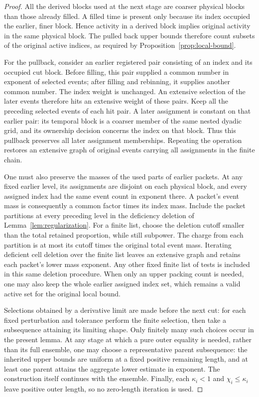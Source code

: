 \begin{proof}
All the derived blocks used at the next stage are coarser physical blocks
than those already filled. A filled time is present only because its
index occupied the earlier, finer block. Hence activity in a derived
block implies original activity in the same physical block. The pulled
back upper bounds therefore count subsets of the original active
indices, as required by Proposition~\ref{prop:local-bound}.

For the pullback, consider an earlier registered pair consisting of an
index and its occupied cut block. Before filling, this pair supplied a
common number in exponent of selected events; after filling and
rebinning, it supplies another common number. The index weight is
unchanged. An extensive selection of the later events therefore hits an
extensive weight of these pairs. Keep all the preceding selected events
of each hit pair. A later assignment is constant on that earlier pair:
its temporal block is a coarser member of the same nested dyadic grid,
and its ownership decision concerns the index on that block. Thus this
pullback preserves all later assignment memberships. Repeating the
operation restores an extensive graph of original events carrying all
assignments in the finite chain.

One must also preserve the masses of the used parts of earlier packets.
At any fixed earlier level, its assignments are disjoint on each physical
block, and every assigned index had the same event count in exponent
there. A packet's event mass is consequently a common factor times its
index mass. Include the packet partitions at every preceding level in
the deficiency deletion of Lemma~\ref{lem:regularization}. For a finite
list, choose the deletion cutoff smaller than the total retained
proportion, while still subpower. The charge from each partition is at
most its cutoff times the original total event mass. Iterating deficient
cell deletion over the finite list leaves an extensive graph and retains
each packet's lower mass exponent. Any other fixed finite list of tests
is included in this same deletion procedure. When only an upper packing
count is needed, one may also keep the whole earlier assigned index set,
which remains a valid active set for the original local bound.

Selections obtained by a derivative limit are made before the next cut:
for each fixed perturbation and tolerance perform the finite selection,
then take a subsequence attaining its limiting shape. Only finitely many
such choices occur in the present lemma. At any stage at which a pure
outer equality is needed, rather than its full ensemble, one may choose
a representative parent subsequence: the inherited upper bounds are
uniform at a fixed positive remaining length, and at least one parent
attains the aggregate lower estimate in exponent. The construction
itself continues with the ensemble. Finally, each $\kappa_i<1$ and
$\chi_i\le\kappa_i$ leave positive outer length, so no zero-length
iteration is used.
\end{proof}

